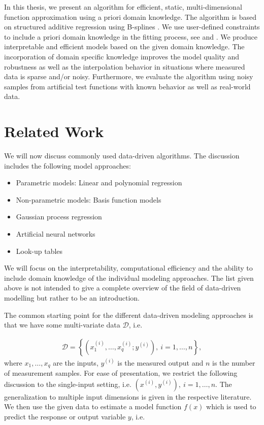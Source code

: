 In this thesis, we present an algorithm for efficient, static, multi-dimensional function approximation using a priori domain knowledge. The algorithm is based on structured additive regression using B-splines \cite{fahrmeir2007regression}. We use user-defined constraints to include a priori domain knowledge in the fitting process, see \cite{hofner2011monotonicity} and \cite{bollaerts2006simple}. We produce interpretable and efficient models based on the given domain knowledge. The incorporation of domain specific knowledge improves the model quality and robustness as well as the interpolation behavior in situations where measured data is sparse and/or noisy. Furthermore, we evaluate the algorithm using noisy samples from artificial test functions with known behavior as well as real-world data.
\section{Related Work}

We will now discuss commonly used data-driven algorithms. The discussion includes the following model approaches:

\begin{itemize}
	\item Parametric models: Linear and polynomial regression
	\item Non-parametric models: Basis function models
	\item Gaussian process regression
	\item Artificial neural networks
	\item Look-up tables
\end{itemize}
%
We will focus on the interpretability, computational efficiency and the ability to include domain knowledge of the individual modeling approaches. The list given above is not intended to give a complete overview of the field of data-driven modelling but rather to be an introduction.

The common starting point for the different data-driven modeling approaches is that we have some multi-variate data $\mathcal{D}$, i.e.

\begin{align}
	\mathcal{D} = \left\{ (x_1^{(i)}, \dots, x_q^{(i)}; y^{(i)} ), \ i = 1, \dots, n\right\},
\end{align} 
%
where $x_1, \dots, x_q$ are the inputs, $y^{(i)}$ is the measured output and $n$ is the number of measurement samples. For ease of presentation, we restrict the following discussion to the single-input setting, i.e. $(x^{(i)}, y^{(i)}), \ i=1, \dots, n$. The generalization to multiple input dimensions is given in the respective literature. We then use the given data to estimate a model function $f(x)$  which is used to predict the response or output variable $y$, i.e.

